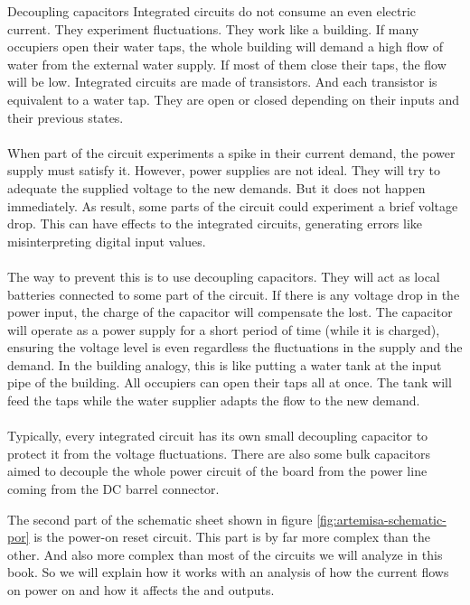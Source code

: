 \begin{theory}[h]{Decoupling capacitors}
  Integrated circuits do not consume an even electric current. They experiment fluctuations. They work like a building. If many occupiers open their water taps, the whole building will demand a high flow of water from the external water supply. If most of them close their taps, the flow will be low. Integrated circuits are made of transistors. And each transistor is equivalent to a water tap. They are open or closed depending on their inputs and their previous states.\\\\

  When part of the circuit experiments a spike in their current demand, the power supply must satisfy it. However, power supplies are not ideal. They will try to adequate the supplied voltage to the new demands. But it does not happen immediately. As result, some parts of the circuit could experiment a brief voltage drop. This can have effects to the integrated circuits, generating errors like misinterpreting digital input values.\\\\

  The way to prevent this is to use decoupling capacitors. They will act as local batteries connected to some part of the circuit. If there is any voltage drop in the power input, the charge of the capacitor will compensate the lost. The capacitor will operate as a power supply for a short period of time (while it is charged), ensuring the voltage level is even regardless the fluctuations in the supply and the demand. In the building analogy, this is like putting a water tank at the input pipe of the building. All occupiers can open their taps all at once. The tank will feed the taps while the water supplier adapts the flow to the new demand.\\\\

  Typically, every integrated circuit has its own small decoupling capacitor to protect it from the voltage fluctuations. There are also some bulk capacitors aimed to decouple the whole power circuit of the board from the power line coming from the DC barrel connector.
\end{theory}

The second part of the schematic sheet shown in figure \ref{fig:artemisa-schematic-por} is the power-on reset circuit. This part is by far more complex than the other. And also more complex than most of the circuits we will analyze in this book. So we will explain how it works with an analysis of how the current flows on power on and how it affects the  and  outputs.

